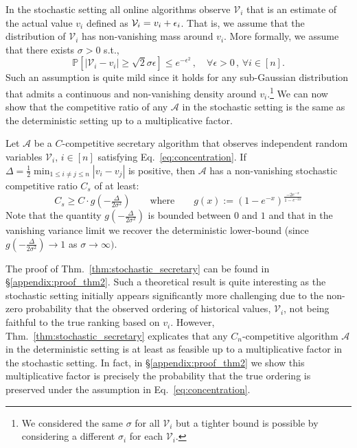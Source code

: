 In the stochastic setting all online algorithms observe $\mathcal{V}_i$ that is an estimate of the actual value $v_i$ defined as $\mathcal{V}_i = v_i + {\epsilon}_i$. That is, we assume that the distribution of $\mathcal{V}_{i}$ has non-vanishing mass around $v_i$. More formally, we assume that there exists $\sigma>0$ s.t., 
    \begin{equation}
        \mathbb{P}[|\mathcal{V}_{i}-v_i| \geq \sqrt{2}\sigma \epsilon] \leq e^{-\epsilon^2} \,,\quad \forall \epsilon >0\,,\,\forall i \in [n].
        \label{eq:concentration}
    \end{equation}
Such an assumption is quite mild since it holds for any sub-Gaussian distribution that admits a continuous and non-vanishing density around $v_i$.\footnote{We considered the same $\sigma$ for all $\mathcal{V}_{i}$ but a tighter bound is possible by considering a different $\sigma_i$ for each $\mathcal{V}_{i}$.}
We can now show that the competitive ratio of any $\mathcal{A}$ in the stochastic setting is the same as the deterministic setting up to a multiplicative factor.
\begin{theorem}\label{thm:stochastic_secretary}
Let $\mathcal{A}$ be a $C$-competitive secretary algorithm that observes independent random variables $\mathcal{V}_{i},\, i\in [n]$ satisfying Eq.~\ref{eq:concentration}. If $\Delta = \tfrac{1}{2}\min_{1\leq i \neq j \leq  n } |v_i - v_j|$ is positive, then $\mathcal{A}$ has a non-vanishing stochastic competitive ratio $C_{s}$ of at least:  
\begin{equation}
   C_{s} \geq  C \cdot g( -\tfrac{\Delta}{2\sigma^2})  \qquad  \text{where} \qquad g(x) := \left( 1-e^{- x} \right)^{\frac{-2 e^{-x}}{1 -  e^{-2x}}}
\end{equation}
Note that the quantity $g\left( -\tfrac{\Delta}{2\sigma^2}\right)$ is bounded between $0$ and $1$ and that in the vanishing variance limit we recover the deterministic lower-bound (since $g( -\tfrac{\Delta}{2\sigma^2}) {\to} 1$ as $\sigma \to \infty)$.
\end{theorem}

The proof of Thm.~\ref{thm:stochastic_secretary} can be found in \S\ref{appendix:proof_thm2}. Such a theoretical result is quite interesting as the stochastic setting initially appears significantly more challenging due to the non-zero probability that the observed ordering of historical values, $\mathcal{V}_i$, not being faithful to the true ranking based on $v_i$. However, Thm.~\ref{thm:stochastic_secretary} explicates that any $C_n$-competitive algorithm $\mathcal{A}$ in the deterministic setting is at least as feasible up to a multiplicative factor in the stochastic setting. In fact, in \S\ref{appendix:proof_thm2} we show this multiplicative factor is precisely the probability that the true ordering  is preserved under the assumption in Eq.~\ref{eq:concentration}.


